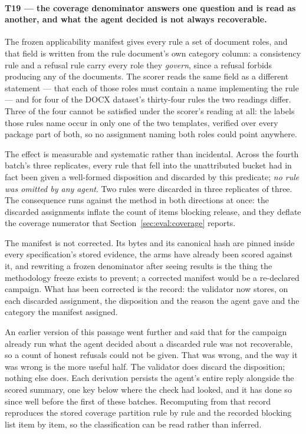 \paragraph{T19 --- the coverage denominator answers one question and is read as another,
and what the agent decided is not always recoverable.}
The frozen applicability manifest gives every rule a set of document roles, and that field is
written from the rule document's own category column: a consistency rule and a refusal rule
carry every role they \emph{govern}, since a refusal forbids producing any of the documents. The
scorer reads the same field as a different statement --- that each of those roles must contain a
name implementing the rule --- and for four of the DOCX dataset's thirty-four rules the two
readings differ. Three of the four cannot be satisfied under the scorer's reading at all: the
labels those rules name occur in only one of the two templates, verified over every package part
of both, so no assignment naming both roles could point anywhere.

The effect is measurable and systematic rather than incidental. Across the fourth batch's three
replicates, every rule that fell into the unattributed bucket had in fact been given a
well-formed disposition and discarded by this predicate; \emph{no rule was omitted by any
agent}. Two rules were discarded in three replicates of three. The consequence runs against the
method in both directions at once: the discarded assignments inflate the count of items blocking
release, and they deflate the coverage numerator that Section~\ref{sec:eval:coverage} reports.

The manifest is not corrected. Its bytes and its canonical hash are pinned inside every
specification's stored evidence, the arms have already been scored against it, and rewriting a
frozen denominator after seeing results is the thing the methodology freeze exists to prevent; a
corrected manifest would be a re-declared campaign. What has been corrected is the record: the
validator now stores, on each discarded assignment, the disposition and the reason the agent
gave and the category the manifest assigned.

An earlier version of this passage went further and said that for the campaign already run what
the agent decided about a discarded rule was not recoverable, so a count of honest refusals
could not be given. That was wrong, and the way it was wrong is the more useful half. The
validator does discard the disposition; nothing else does. Each derivation persists the agent's
entire reply alongside the scored summary, one key below where the check had looked, and it has
done so since well before the first of these batches. Recomputing from that record reproduces
the stored coverage partition rule by rule and the recorded blocking list item by item, so the
classification can be read rather than inferred.

